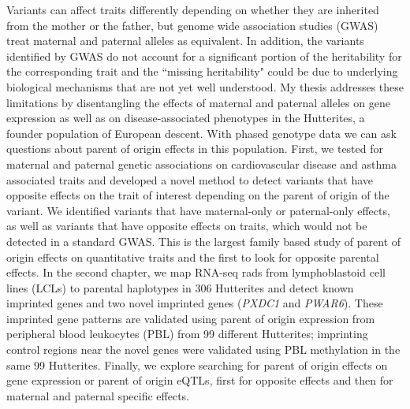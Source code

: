 \abstract

Variants can affect traits differently depending on whether they are inherited from the mother or the father, but genome wide association studies (GWAS) treat maternal and paternal alleles as equivalent. In addition, the variants identified by GWAS do not account for a significant portion of the heritability for the corresponding trait and the ``missing heritability" could be due to underlying biological mechanisms that are not yet well understood. My thesis addresses these limitations by disentangling the effects of maternal and paternal alleles on gene expression as well as on disease-associated phenotypes in the Hutterites, a founder population of European descent. With phased genotype data we can ask questions about parent of origin effects in this population. First, we tested for maternal and paternal genetic associations on cardiovascular disease and asthma associated traits and developed a novel method to detect variants that have opposite effects on the trait of interest depending on the parent of origin of the variant. We identified variants that have maternal-only or paternal-only effects, as well as variants that have opposite effects on traits, which would not be detected in a standard GWAS. This is the largest family based study of parent of origin effects on quantitative traits and the first to look for opposite parental effects. In the second chapter, we map RNA-seq rads from lymphoblastoid cell lines (LCLs) to parental haplotypes in 306  Hutterites and detect known imprinted genes and two novel imprinted genes (\emph{PXDC1} and \emph{PWAR6}). These imprinted gene patterns are validated using parent of origin expression from peripheral blood leukocytes (PBL)  from 99 different Hutterites; imprinting control regions near the novel genes were validated using PBL methylation in the same 99 Hutterites. Finally, we explore searching for parent of origin effects on gene expression or parent of origin eQTLs, first for opposite effects and then for maternal and paternal specific effects. 
